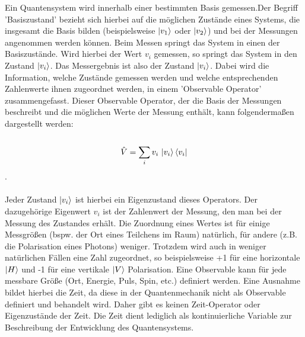 Ein Quantensystem wird innerhalb einer bestimmten Basis gemessen.Der Begriff 'Basiszustand' bezieht sich hierbei auf die möglichen Zustände eines Systems, die insgesamt die Basis bilden (beispielsweise $\ket{v_1}$ oder $\ket{v_2}$) und bei der Messungen angenommen werden können.
Beim Messen springt das System in einen der Basiszustände. 
Wird hierbei der Wert $v_i$ gemessen, so springt das System in den Zustand $\ket{v_i}$. Das Messergebnis ist also der Zustand $\ket{v_i}$. 
Dabei wird die Information, welche Zustände gemessen werden und welche entsprechenden Zahlenwerte ihnen zugeordnet werden, in einem 'Observable Operator' zusammengefasst. 
Dieser Observable Operator, der die Basis der Messungen beschreibt und die möglichen Werte der Messung enthält, kann folgendermaßen dargestellt werden: \\
\\
\begin{equation}
\hat{V} = \sum_i v_i \, \ket{v_i}\bra{v_i}
\end{equation}.
\\ 
\\
Jeder Zustand $\ket{v_i}$ ist hierbei ein Eigenzustand dieses Operators. Der dazugehörige Eigenwert $v_i$ ist der Zahlenwert der Messung, den man bei der Messung des Zustandes erhält. 
Die Zuordnung eines Wertes ist für einige Messgrößen (bspw. der Ort eines Teilchens im Raum) natürlich, für andere (z.B. die Polarisation eines Photons) weniger. Trotzdem wird auch in weniger natürlichen Fällen  eine Zahl zugeordnet, so beispielsweise
+1 für eine horizontale $\ket{H}$ und -1 für eine vertikale $\ket{V}$ Polarisation. Eine Observable kann für jede messbare Größe (Ort, Energie, Puls, Spin, etc.) definiert werden. Eine Ausnahme bildet hierbei die Zeit, da diese in der Quantenmechanik nicht als Observable definiert und behandelt wird.
Daher gibt es keinen Zeit-Operator oder Eigenzustände der Zeit. Die Zeit dient lediglich als kontinuierliche Variable zur Beschreibung der Entwicklung des Quantensystems. 
\cite{lvosvsky_quantum_2018} 
\\
\\

